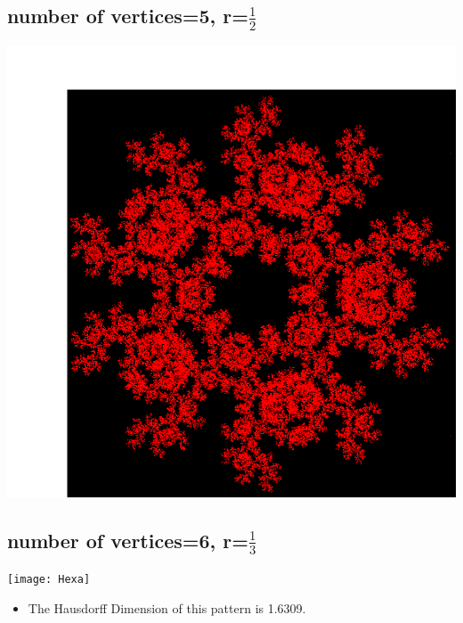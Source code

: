 \documentclass[a0,portrait]{a0poster}
\begin{document}
\begin{multicols}{3}

\section*{number of vertices=5, r=$\frac{1}{2}$}
\begin{center}\vspace{0.4cm}
\includegraphics[width=0.5\linewidth]{Penta}
\end{center}\vspace{1cm}

\subsection*{number of vertices=6, r=$\frac{1}{3}$}
\begin{center}\vspace{0.4cm}
\texttt{[image: Hexa]}
\end{center}\vspace{1cm}
\begin{itemize}
\item The Hausdorff Dimension of this pattern is 1.6309.
\end{itemize}

\end{multicols}
\end{document}

